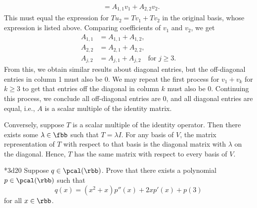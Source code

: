 \begin{sol}
\begin{align*}
        &= A_{1, 1}v_1 + A_{2, 2}v_2.
    \end{align*}
    This must equal the expression for $Tu_2 = Tv_1 + Tv_2$ in the original basis, whose expression is listed above.
	Comparing coefficients of $v_1$ and $v_2$, we get
    \begin{align*}
        A_{1, 1} &= A_{1, 1} + A_{1, 2}, \\
        A_{2, 2} &= A_{2, 1} + A_{2, 2}, \\ 
        A_{j, 2} &= A_{j, 1} + A_{j, 2} \quad \text{for } j \geq 3.
    \end{align*}
    From this, we obtain similar results about diagonal entries, but the off-diagonal entries in column 1 must also be 0.
	We may repeat the first process for $v_1 + v_k$ for $k \geq 3$ to get that entries off the diagonal in column $k$ must also be 0.
	Continuing this process, we conclude all off-diagonal entries are 0, and all diagonal entries are equal, i.e., $A$ is a scalar multiple of the identity matrix.

    Conversely, suppose $T$ is a scalar multiple of the identity operator.
	Then there exists some $\lambda \in \fbb$ such that $T = \lambda I$.
	For any basis of $V$, the matrix representation of $T$ with respect to that basis is the diagonal matrix with $\lambda$ on the diagonal.
	Hence, $T$ has the same matrix with respect to every basis of $V$.
\end{sol}

\begin{exercise}*{3d20}
    Suppose $q \in \pcal(\rbb)$.
	Prove that there exists a polynomial $p \in \pcal(\rbb)$ such that
    \[
    	q(x) = (x^2 + x) p''(x) + 2x p'(x) + p(3)
    \]
    for all $x \in \rbb$.
\end{exercise}

